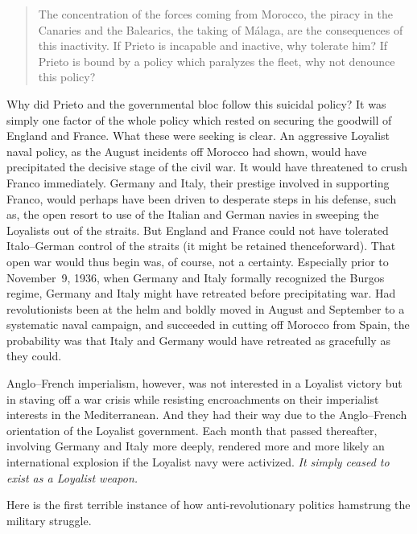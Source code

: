 \indexIPrieto{}
\begin{quotation}
  The concentration of the forces coming from Morocco, the piracy in the Canaries and the Balearics, the taking of M\'alaga, are the consequences of this inactivity. If Prieto is incapable and inactive, why tolerate him? If Prieto is bound by a policy which paralyzes the fleet, why not denounce this policy?
\end{quotation}

Why did Prieto and the governmental bloc follow this suicidal policy? It was simply one factor of the whole policy which rested on securing the goodwill of England and France. What these were seeking is clear. An aggressive Loyalist naval policy\kn, as the August incidents off Morocco had shown, would have precipitated the decisive stage of the civil war. It would have threatened to crush Franco immediately. Germany and Italy, their prestige involved in supporting Franco, would perhaps have been driven to desperate steps in his defense, such as, the open resort to use of the Italian and German navies in sweeping the Loyalists out of the straits. But England and France could not have tolerated Italo--German control of the straits (it might be retained thenceforward). That open war would thus begin was, of course, not a certainty. Especially prior to November~9, 1936, when Germany and Italy formally recognized the Burgos regime, Germany and Italy might have retreated before precipitating war. Had revolutionists been at the helm and boldly moved in August and September to a systematic naval campaign, and succeeded in cutting off Morocco from Spain, the probability was that Italy and Germany would have retreated as gracefully as they could.

Anglo--French imperialism, however, was not interested in a Loyal\-ist victory but in staving off a war crisis while resisting encroachments on their imperialist interests in the Mediterranean. And they had their way due to the Anglo--French orientation of the Loyalist government. Each month that passed thereafter\kn, involving Germany and Italy more deeply\kn, rendered more and more likely an international explosion if the Loyalist navy were activized. \emph{It simply ceased to exist as a Loyalist weapon.}

Here is the first terrible instance of how anti-revolutionary politics hamstrung the military struggle.

